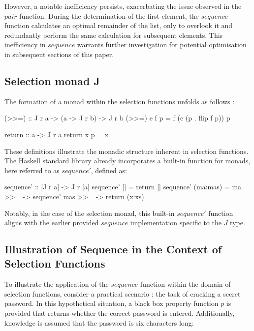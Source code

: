 \documentclass[runningheads]{llncs}
\begin{document}
\qquad However, a notable inefficiency persists, exacerbating the issue
observed in the \(pair\) function. During the determination of the first
element, the \(sequence\) function calculates an optimal remainder of
the list, only to overlook it and redundantly perform the same
calculation for subsequent elements. This inefficiency in \(sequence\)
warrants further investigation for potential optimisation in subsequent
sections of this paper.

\subsection{Selection monad J}\label{selection-monad-j}

The formation of a monad within the selection functions unfolds as
follows \cite{escardo2010selection}:

\begin{code}
(>>=) :: J r a -> (a -> J r b) -> J r b
(>>=) e f p = f (e (p . flip f p)) p
\end{code}

\begin{code}
return :: a -> J r a
return x p = x
\end{code}

These definitions illustrate the monadic structure inherent in selection
functions. The Haskell standard library already incorporates a built-in
function for monads, here referred to as \(sequence'\), defined as:

\begin{code}
sequence' :: [J r a] -> J r [a]
sequence' []     = return []
sequence' (ma:mas) = ma >>= 
                    \x -> sequence' mas >>= 
                    \xs -> return (x:xs)
\end{code}

Notably, in the case of the selection monad, this built-in \(sequence'\)
function aligns with the earlier provided \(sequence\) implementation
specific to the \(J\) type.

\subsection{Illustration of Sequence in the Context of Selection
Functions}\label{illustration-of-sequence-in-the-context-of-selection-functions}

To illustrate the application of the \(sequence\) function within the
domain of selection functions, consider a practical scenario
\cite{hartmann2022algorithm}: the task of cracking a secret password. In
this hypothetical situation, a black box property function \(p\) is
provided that returns whether the correct password is entered.
Additionally, knowledge is assumed that the password is six characters
long:
\end{document}

